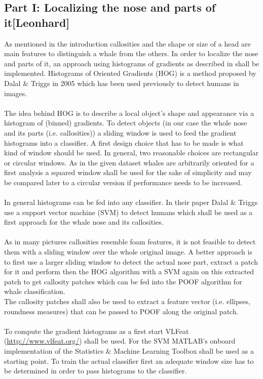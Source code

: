 \documentclass[11pt,a4paper,oneside]{report}
\begin{document}
\subsection*{Part I: Localizing the nose and parts of it[Leonhard]}
As mentioned in the introduction callosities and the shape or size of a head are main features to distinguish a whale from the others. In order to localize the nose and parts of it, an approach using histograms of gradients as described in \citep{dalal2005histograms}
shall be implemented. Histograms of Oriented Gradients (HOG) is a method proposed by Dalal \& Triggs in 2005 which has been used previously to detect humans in images. 
\\
\\
The idea behind HOG is to describe a local object's shape and appearance via a histogram of (binned) gradients. To detect objects (in our case the whole nose and its parts (i.e. callosities)) a sliding window is used to feed the gradient histograms into a classifier. A first design choice that has to be made is what kind of window should be used. In general, two reasonable choices are rectangular or circular windows. As in the given dataset whales are arbitrarily oriented for a first analysis a squared window shall be used for the sake of simplicity and may be compared later to a circular version if performance needs to be increased.
\\
\\
In general histograms can be fed into any classifier. In their paper Dalal \& Triggs use a support vector machine (SVM) to detect humans which shall be used as a first approach for the whale nose and its callosities.
\\
\\
As in many pictures callosities resemble foam features, it is not feasible to detect them with a sliding window over the whole original image. A better approach is to first use a larger sliding window to detect the actual nose part, extract a patch for it and perform then the HOG algorithm with a SVM again on this extracted patch to get callosity patches which can be fed into the POOF algorithm for whale classification.
\\
The callosity patches shall also be used to extract a feature vector (i.e. ellipses, roundness measures) that can be passed to POOF along the original patch.
\\
\\
To compute the gradient histograms as a first start VLFeat (\url{http://www.vlfeat.org/}) shall be used. For the SVM MATLAB's onboard implementation of the Statistics \& Machine Learning Toolbox shall be used as a starting point. To train the actual classifier first an adequate window size has to be determined in order to pass histograms to the classifier.
\end{document}
